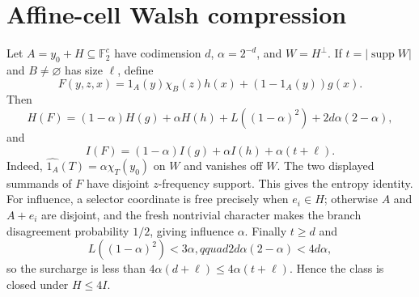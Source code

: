 \documentclass{article}
\begin{document}
\section*{Affine-cell Walsh compression}
Let $A=y_0+H\subseteq\mathbb F_2^c$ have codimension $d$,
$\alpha=2^{-d}$, and $W=H^\perp$.  If
$t=|\operatorname{supp}W|$ and $B\ne\varnothing$ has size $\ell$, define
\[
F(y,z,x)=1_A(y)\chi_B(z)h(x)+(1-1_A(y))g(x).
\]
Then
\[
H(F)=(1-\alpha)H(g)+\alpha H(h)
+L((1-\alpha)^2)+2d\alpha(2-\alpha),
\]
and
\[
I(F)=(1-\alpha)I(g)+\alpha I(h)+\alpha(t+\ell).
\]
Indeed, $\widehat{1_A}(T)=\alpha\chi_T(y_0)$ on $W$ and vanishes
off $W$.  The two displayed summands of $F$ have disjoint $z$-frequency
support.  This gives the entropy identity.  For influence, a selector
coordinate is free precisely when $e_i\in H$; otherwise $A$ and
$A+e_i$ are disjoint, and the fresh nontrivial character makes the
branch disagreement probability $1/2$, giving influence $\alpha$.
Finally $t\ge d$ and
\[
L((1-\alpha)^2)<3\alpha,qquad
2d\alpha(2-\alpha)<4d\alpha,
\]
so the surcharge is less than $4\alpha(d+\ell)\le
4\alpha(t+\ell)$.  Hence the class is closed under $H\le4I$.
\end{document}
